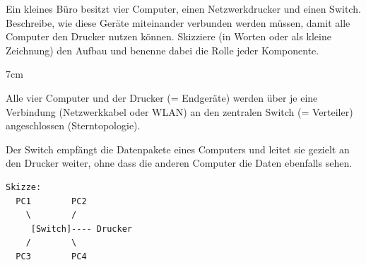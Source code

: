 \question[3]
Ein kleines Büro besitzt vier Computer, einen Netzwerkdrucker und einen Switch.
Beschreibe, wie diese Geräte miteinander verbunden werden müssen, 
damit alle Computer den Drucker nutzen können.
Skizziere (in Worten oder als kleine Zeichnung) den Aufbau und benenne 
dabei die Rolle jeder Komponente.

\begin{solutionbox}{7cm}

Alle vier Computer und der Drucker (= Endgeräte) werden über
je eine Verbindung (Netzwerkkabel oder WLAN) an den zentralen
Switch (= Verteiler) angeschlossen (Sterntopologie).

Der Switch empfängt die Datenpakete eines Computers und leitet
sie gezielt an den Drucker weiter, ohne dass die anderen
Computer die Daten ebenfalls sehen.

\begin{lstlisting}
Skizze:
  PC1        PC2
    \        /
     [Switch]---- Drucker
    /        \
  PC3        PC4
\end{lstlisting}
\end{solutionbox}